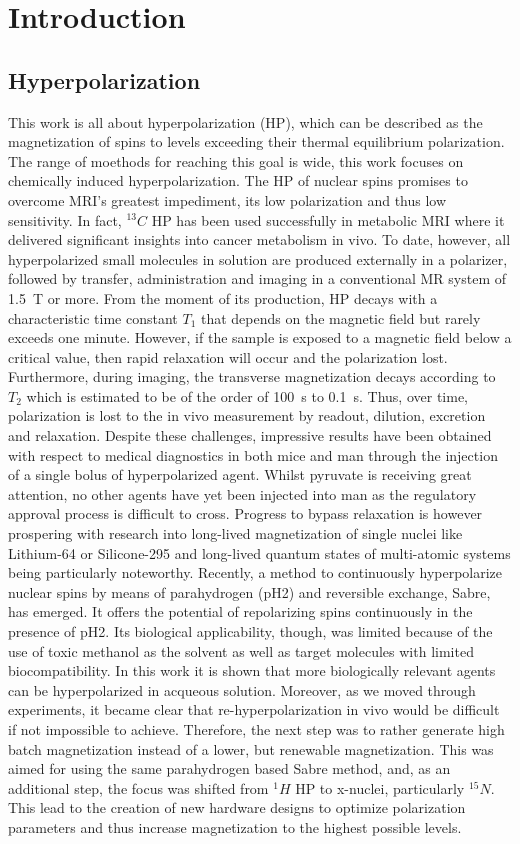 \chapter{Introduction}\label{chap:introduction}
\section{Hyperpolarization}
This work is all about hyperpolarization (HP), which can be described as the magnetization of spins to levels exceeding their thermal equilibrium polarization. The range of moethods for reaching this goal is wide, this work focuses on chemically induced hyperpolarization.
The HP of nuclear spins promises to overcome MRI's greatest impediment, its low polarization and thus low sensitivity. In fact, $^{13}C$ HP has been used successfully in metabolic MRI where it delivered significant insights into cancer metabolism in vivo. To date, however, all hyperpolarized small molecules in solution are produced externally in a polarizer, followed by transfer, administration and imaging in a conventional MR system of \SI{1.5}{\tesla} or more. From the moment of its production, HP decays with a characteristic time constant $T_1$ that depends on the magnetic field but rarely exceeds one minute. However, if the sample is exposed to a magnetic field below a critical value, then rapid relaxation will occur and the polarization lost. Furthermore, during imaging, the transverse magnetization decays according to $T_2$ which is estimated to be of the order of \SI{100}{\second} to  \SI{0.1}{\second}. Thus, over time, polarization is lost to the in vivo measurement by readout, dilution, excretion and relaxation. Despite these challenges, impressive results have been obtained with respect to medical diagnostics in both mice and man through the injection of a single bolus of hyperpolarized agent. Whilst pyruvate is receiving great attention, no other agents have yet been injected into man as the regulatory approval process is difficult to cross. Progress to bypass relaxation is however prospering with research into long-lived magnetization of single nuclei like Lithium-64 or Silicone-295 and long-lived quantum states of multi-atomic systems being particularly noteworthy. Recently, a method to continuously hyperpolarize  nuclear spins by means of parahydrogen (pH2) and reversible exchange, Sabre, has emerged. It offers the potential of repolarizing spins continuously in the presence of pH2. Its biological applicability, though, was limited because of the use of toxic methanol as the solvent as well as target molecules with limited biocompatibility. In this work it is shown that more biologically relevant agents can be hyperpolarized in acqueous solution. Moreover, as we moved through experiments, it became clear that re-hyperpolarization in vivo would be difficult if not impossible to achieve. Therefore, the next step was to rather generate high batch magnetization instead of a lower, but renewable magnetization. This was aimed for using the same parahydrogen based Sabre method, and, as an additional step, the focus was shifted from $^1H$ HP to x-nuclei, particularly $^{15}N$. This lead to the creation of new hardware designs to optimize polarization parameters and thus increase magnetization to the highest possible levels.
